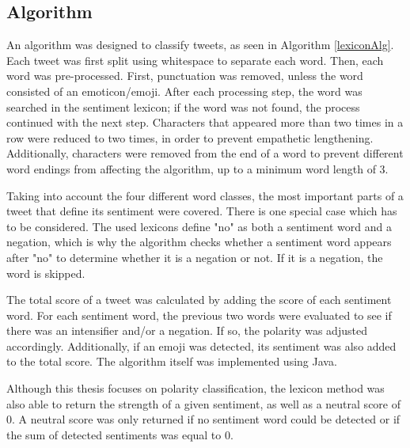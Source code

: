 \subsection{Algorithm}

An algorithm was designed to classify tweets, as seen in Algorithm \ref{lexiconAlg}. Each tweet was first split using whitespace to separate each word. Then, each word was pre-processed. First, punctuation was removed, unless the word consisted of an emoticon/emoji. After each processing step, the word was searched in the sentiment lexicon; if the word was not found, the process continued with the next step. Characters that appeared more than two times in a row were reduced to two times, in order to prevent empathetic lengthening. Additionally, characters were removed from the end of a word to prevent different word endings from affecting the algorithm, up to a minimum word length of 3.

Taking into account the four different word classes, the most important parts of a tweet that define its sentiment were covered. There is one special case which has to be considered. The used lexicons define "no" as both a sentiment word and a negation, which is why the algorithm checks whether a sentiment word appears after "no" to determine whether it is a negation or not. If it is a negation, the word is skipped.

The total score of a tweet was calculated by adding the score of each sentiment word. For each sentiment word, the previous two words were evaluated to see if there was an intensifier and/or a negation. If so, the polarity was adjusted accordingly. Additionally, if an emoji was detected, its sentiment was also added to the total score. The algorithm itself was implemented using Java.

Although this thesis focuses on polarity classification, the lexicon method was also able to return the strength of a given sentiment, as well as a neutral score of 0. A neutral score was only returned if no sentiment word could be detected or if the sum of detected sentiments was equal to 0.


